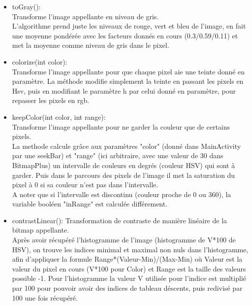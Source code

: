\documentclass[12pt]{article}
\begin{document}
\begin{itemize}
    \item toGray():\\ 
    Transforme l'image appellante en niveau de gris.\\
    L'algorithme prend juste les niveaux de rouge, vert et bleu de l'image, en fait une moyenne pondérée avec les facteurs donnés en cours (0.3/0.59/0.11) 
    et met la moyenne comme niveau de gris dans le pixel.

    \item colorize(int color):\\
    
    Transforme l'image appellante pour que chaque pixel aie une teinte donné en paramètre.
    La méthode modifie simplement la teinte en passant les pixels en Hsv, puis en modifiant le paramètre h par celui donné en paramètre, pour repasser les pixels en rgb.\\ 


    \item keepColor(int color, int range):\\
    
    Transforme l'image appellante pour ne garder la couleur que de certains pixels.\\
    La methode calcule grâce aux paramètres "color" (donné dans MainActivity par une seekBar) et "range" (ici arbitraire, avec une valeur de 30 dans BitmapPlus) un intervalle de couleurs en degrés (couleur HSV) qui sont à garder. Puis dans le parcours des pixels de l'image il 
    met la saturation du pixel à 0 si sa couleur n'est pas dans l'intervalle.\\
    A noter que si l'intervalle est discontinu (couleur proche de 0 ou 360), la variable booléen "inRange" est calculée différement.

    \item contrastLinear():
    Transformation de contraste de manière linéaire de la bitmap appellante.\\
    Après avoir récupéré l'histogramme de l'image (histogramme de V*100 de HSV),
    on trouve les indices minimal et maximal non nuls dans l'histogramme, afin d'appliquer la formule Range*(Valeur-Min)/(Max-Min) où Valeur est 
    la valeur du pixel en cours (V*100 pour Color) et Range est la taille des valeurs possible -1. Pour l'histogramme la valeur V utilisée pour l'indice est multiplié par 100 pour pouvoir avoir des indices de tableau 
    déscents, puis redivisé par 100 une fois récupéré.\\


\end{itemize}
\end{document}
